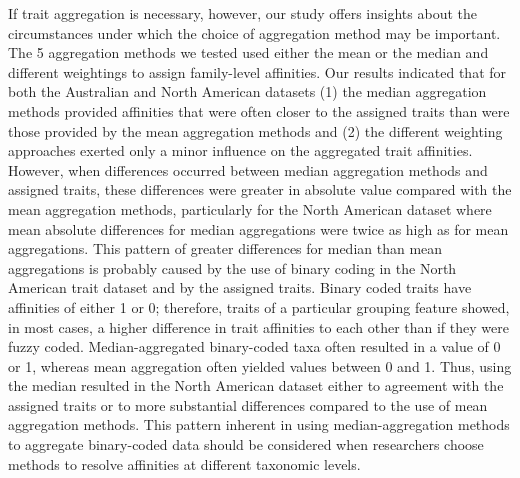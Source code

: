 \documentclass[12pt]{article}
\begin{document}
If trait aggregation is necessary, however, our study offers insights about the circumstances under which the choice of aggregation method may be important. The 5 aggregation methods we tested used either the mean or the median and different weightings to assign family-level affinities. Our results indicated that for both the Australian and North American datasets (1) the median aggregation methods provided affinities that were often closer to the assigned traits than were those provided by the mean aggregation methods and (2) the different weighting approaches exerted only a minor influence on the aggregated trait affinities. However, when differences occurred between median aggregation methods and assigned traits, these differences were greater in absolute value compared with the mean aggregation methods, particularly for the North American dataset where mean absolute differences for median aggregations were twice as high as for mean aggregations. This pattern of greater differences for median than mean aggregations is probably caused by the use of binary coding in the North American trait dataset and by the assigned traits. Binary coded traits have affinities of either 1 or 0; therefore, traits of a particular grouping feature showed, in most cases, a higher difference in trait affinities to each other than if they were fuzzy coded. Median-aggregated binary-coded taxa often resulted in a value of 0 or 1, whereas mean aggregation often yielded values between 0 and 1. Thus, using the median resulted in the North American dataset either to agreement with the assigned traits or to more substantial differences compared to the use of mean aggregation methods. This pattern inherent in using median-aggregation methods to aggregate binary-coded data should be considered when researchers choose methods to resolve affinities at different taxonomic levels. 
\end{document}
